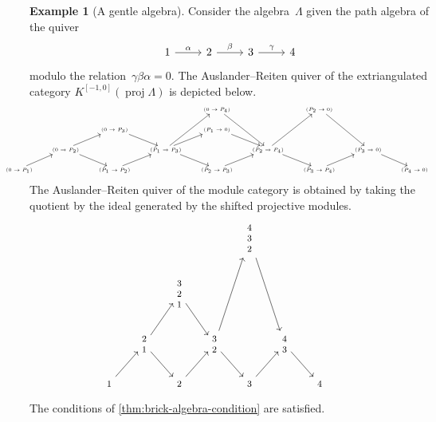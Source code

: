 \documentclass{amsart}
\theoremstyle{definition}
\newtheorem{example}[theorem]{Example}
\newcommand{\proj}{\operatorname{proj}}
\begin{document}
\begin{example}[A gentle algebra]
Consider the algebra~$\Lambda$ given the path algebra of the quiver
\[
\begin{tikzcd}
	1 \arrow[r, "\alpha"] & 2\arrow[r, "\beta"] & 3\arrow[r, "\gamma"] & 4
\end{tikzcd}
\]
modulo the relation~$\gamma\beta\alpha = 0$. The Auslander--Reiten quiver of the extriangulated category $K^{[-1, 0]}(\proj\Lambda)$ is depicted below.
\[
\hspace*{-1cm}
{\tiny
\begin{tikzcd}
	&&&& (0\to P_4)\arrow[ddr] && (P_2\to 0)\arrow[ddr] && \\
	&& (0\to P_3)\arrow[dr] && (P_1\to 0)\arrow[dr] &&&& \\
	& (0\to P_2)\arrow[dr]\arrow[ur] && (P_1\to P_3)\arrow[uur]\arrow[ur]\arrow[dr] && (P_2\to P_4)\arrow[uur]\arrow[dr] && (P_3\to 0)\arrow[dr] & \\
	(0\to P_1) \arrow[ur] && (P_1\to P_2)\arrow[ur] && (P_2\to P_3)\arrow[ur]  && (P_3\to P_4)\arrow[ur] && (P_4\to 0)
\end{tikzcd}
}
\]
The Auslander--Reiten quiver of the module category is obtained by taking the quotient by the ideal generated by the shifted projective modules.
\[
\hspace*{-1cm}
{\footnotesize
\begin{tikzcd}
    &&&& \begin{matrix} 4\\3\\2 \end{matrix}\arrow[ddr] && \\
    && \begin{matrix} 3\\2\\1 \end{matrix}\arrow[dr] &&&& \\
    & \begin{matrix} 2\\1 \end{matrix}\arrow[dr]\arrow[ur] && \begin{matrix} 3\\2 \end{matrix}\arrow[uur]\arrow[dr] && \begin{matrix} 4\\3 \end{matrix}\arrow[dr] & \\
    \begin{matrix} 1 \end{matrix} \arrow[ur] && \begin{matrix} 2 \end{matrix}\arrow[ur] && \begin{matrix} 3 \end{matrix}\arrow[ur] && \begin{matrix}4 \end{matrix}
\end{tikzcd}
}
\]
The conditions of \cref{thm:brick-algebra-condition} are satisfied.
\end{example}
\end{document}
